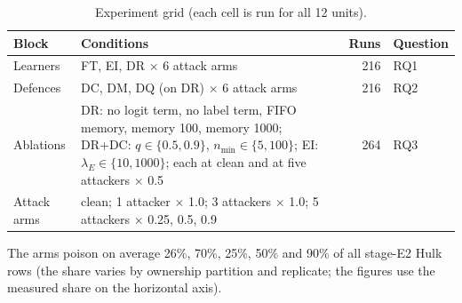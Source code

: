 \documentclass[10pt,a4paper]{article}
\begin{document}
\begin{table}[htbp]
\centering\footnotesize
\caption{Experiment grid (each cell is run for all 12 units).}
\label{tab:grid}
\begin{tabularx}{\linewidth}{L{3.1cm}Y r L{1.8cm}}
\toprule
Block & Conditions & Runs & Question\\
\midrule
Learners & FT, EI, DR $\times$ 6 attack arms & 216 & RQ1\\
Defences & DC, DM, DQ (on DR) $\times$ 6 attack arms & 216 & RQ2\\
Ablations & DR: no logit term, no label term, FIFO memory, memory 100, memory 1000; DR+DC: $q\in\{0.5,0.9\}$, $n_{\min}\in\{5,100\}$; EI: $\lambda_E\in\{10,1000\}$; each at clean and at five attackers $\times$ 0.5 & 264 & RQ3\\
\midrule
Attack arms & clean; 1 attacker $\times$ 1.0; 3 attackers $\times$ 1.0; 5 attackers $\times$ 0.25, 0.5, 0.9 & & \\
\bottomrule
\end{tabularx}
\end{table}

The arms poison on average 26\%, 70\%, 25\%, 50\% and 90\% of all stage-E2 Hulk rows (the share varies by ownership partition and replicate; the figures use the measured share on the horizontal axis).

\end{document}
